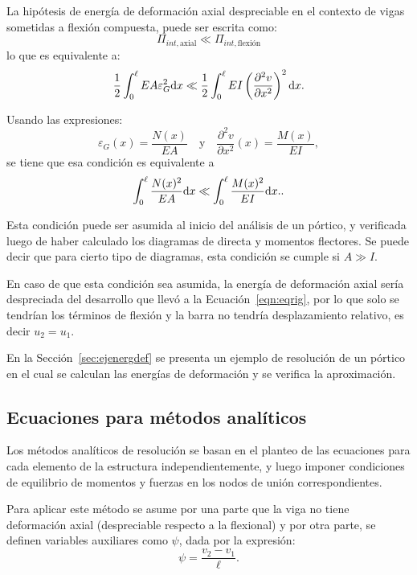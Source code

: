 La hipótesis de energía de deformación axial despreciable en el contexto de vigas sometidas a flexión compuesta, puede ser escrita como:
%
\begin{equation}
	\Pi_{int,\text{axial}} \ll \Pi_{int,\text{flexión}}
\end{equation}
%
lo que es equivalente a:%
%
\begin{equation}
	\frac{1}{2} \int_{0}^{\ell} E A  \varepsilon_G^2 {\text{d}} x \ll \frac{1}{2} \int_{0}^{\ell} EI \left( \frac{\partial^2 v}{\partial x^2}\right)^2 {\text{d}} x.
\end{equation}

Usando las expresiones: 
\begin{equation}
	\varepsilon_G(x) = \frac{	N (x) }{E A}
	\quad
	\text{y}
	\quad
	\frac{\partial^2 v}{\partial x^2}(x) = \frac{	M (x) }{E I} ,
\end{equation}
se tiene que esa condición es equivalente a 
%
\begin{equation}
	\int_{0}^{\ell} \frac{	N (x)^2 }{E A} {\text{d}} x \ll \int_{0}^{\ell} \frac{	M (x)^2 }{E I}  {\text{d}} x..
\end{equation}


Esta condición puede ser asumida al inicio del análisis de un pórtico, y verificada luego de haber calculado los diagramas de directa y momentos flectores. %
%
Se puede decir que para cierto tipo de diagramas, esta condición se cumple si $A \gg I$.

En caso de que esta condición sea asumida, la energía de deformación axial sería despreciada del desarrollo que llevó a la Ecuación~\eqref{eqn:eqrig}, por lo que solo se tendrían los términos de flexión y la barra no tendría desplazamiento relativo, es decir $u_2=u_1$.

En la Sección~\ref{sec:ejenergdef} se presenta un ejemplo de resolución de un pórtico en el cual se calculan las energías de deformación y se verifica la  aproximación.


\subsection{Ecuaciones para métodos analíticos}

Los métodos analíticos de resolución se basan en el planteo de las ecuaciones para cada elemento de la estructura independientemente, y luego imponer condiciones de equilibrio de momentos y fuerzas en los nodos de unión correspondientes. %

Para aplicar este método se asume por una parte que la viga no tiene deformación axial (despreciable respecto a la flexional) y por otra parte, se definen variables auxiliares como $\psi$, dada por la expresión:
%
\begin{equation}
  \psi = \frac{v_2 - v_1}{\ell}.
\end{equation}
%

